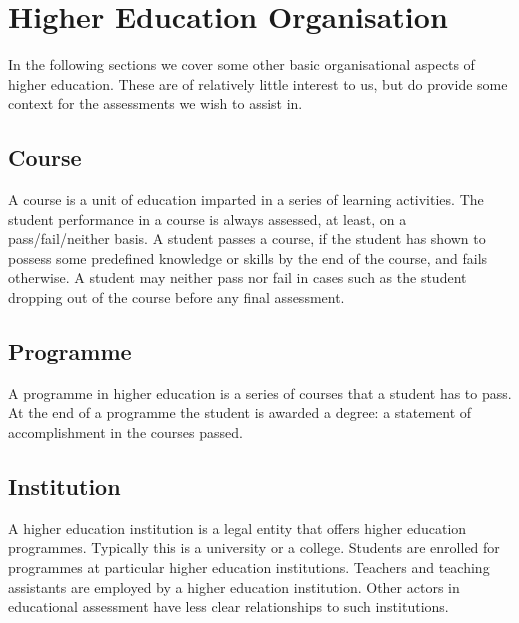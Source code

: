 
\section{Higher Education Organisation}

In the following sections we cover some other basic organisational aspects of
higher education. These are of relatively little interest to us, but do provide
some context for the assessments we wish to assist in.

\subsection{Course}

A course is a unit of education imparted in a series of learning activities.
The student performance in a course is always assessed, at least, on a
pass/fail/neither basis. A student passes a course, if the student has shown to
possess some predefined knowledge or skills by the end of the course, and fails
otherwise.  A student may neither pass nor fail in cases such as the student
dropping out of the course before any final assessment.

\subsection{Programme}

A programme in higher education is a series of courses that a student has to
pass. At the end of a programme the student is awarded a degree: a statement of
accomplishment in the courses passed.

\subsection{Institution}

A higher education institution is a legal entity that offers higher education
programmes. Typically this is a university or a college. Students are enrolled
for programmes at particular higher education institutions. Teachers and
teaching assistants are employed by a higher education institution. Other
actors in educational assessment have less clear relationships to such
institutions.
